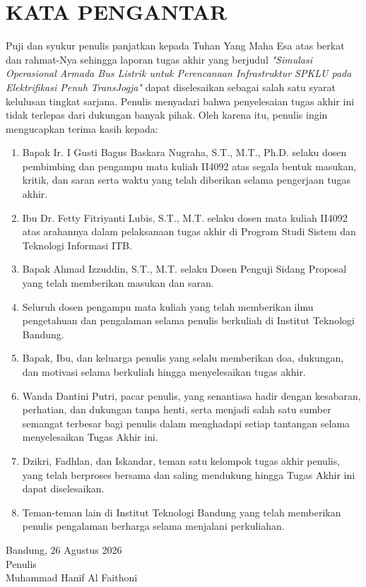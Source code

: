 \chapter*{KATA PENGANTAR}

Puji dan syukur penulis panjatkan kepada Tuhan Yang Maha Esa atas berkat dan
rahmat-Nya sehingga laporan tugas akhir yang berjudul \textit{"Simulasi
	Operasional Armada Bus Listrik untuk Perencanaan Infrastruktur SPKLU pada
	Elektrifikasi Penuh TransJogja"} dapat diselesaikan sebagai salah satu syarat
kelulusan tingkat sarjana. Penulis menyadari bahwa penyelesaian tugas akhir
ini tidak terlepas dari dukungan banyak pihak. Oleh karena itu, penulis ingin
mengucapkan terima kasih kepada:

\begin{enumerate}
	\item Bapak Ir. I Gusti Bagus Baskara Nugraha, S.T., M.T., Ph.D. selaku
	dosen pembimbing dan pengampu mata kuliah II4092 atas segala bentuk
	masukan, kritik, dan saran serta waktu yang telah diberikan selama
	pengerjaan tugas akhir.
	
	\item Ibu Dr. Fetty Fitriyanti Lubis, S.T., M.T. selaku dosen mata kuliah
	II4092 atas arahannya dalam pelaksanaan tugas akhir di Program Studi
	Sistem dan Teknologi Informasi ITB.
	
	\item Bapak Ahmad Izzuddin, S.T., M.T. selaku Dosen Penguji Sidang
	Proposal yang telah memberikan masukan dan saran.
	
	\item Seluruh dosen pengampu mata kuliah yang telah memberikan ilmu
	pengetahuan dan pengalaman selama penulis berkuliah di Institut
	Teknologi Bandung.
	
	\item Bapak, Ibu, dan keluarga penulis yang selalu memberikan doa,
	dukungan, dan motivasi selama berkuliah hingga menyelesaikan tugas
	akhir.
	
	\item Wanda Dantini Putri, pacar penulis, yang senantiasa hadir
	dengan kesabaran, perhatian, dan dukungan tanpa henti, serta menjadi
	salah satu sumber semangat terbesar bagi penulis dalam menghadapi
	setiap tantangan selama menyelesaikan Tugas Akhir ini.
	
	\item Dzikri, Fadhlan, dan Iskandar, teman satu kelompok tugas akhir
	penulis, yang telah berproses bersama dan saling mendukung hingga
	Tugas Akhir ini dapat diselesaikan.
	
	\item Teman-teman lain di Institut Teknologi Bandung yang telah
	memberikan penulis pengalaman berharga selama menjalani perkuliahan.
\end{enumerate}

\begin{flushright}
	Bandung, 26 Agustus 2026\\
	
	Penulis \\
	\vspace{1cm}
	Muhammad Hanif Al Faithoni
\end{flushright}